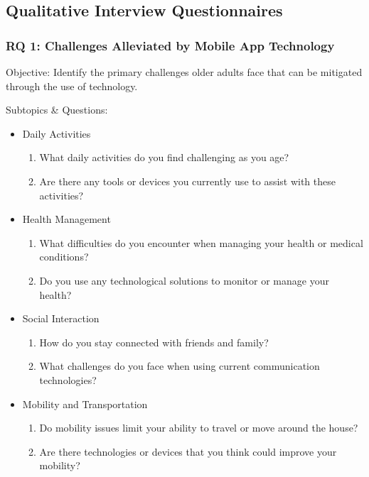 \documentclass[acmlarge]{acmart}
\begin{document}
{\subsection{Qualitative Interview Questionnaires}
\subsubsection{RQ 1: Challenges Alleviated by Mobile App Technology}
Objective: Identify the primary challenges older adults face that can be mitigated through the use of technology.

Subtopics \& Questions:
\begin{itemize}
    \item Daily Activities
    \begin{enumerate}
        \item What daily activities do you find challenging as you age?
        \item Are there any tools or devices you currently use to assist with these activities?
    \end{enumerate}
    
    \item Health Management
    \begin{enumerate}
        \item What difficulties do you encounter when managing your health or medical conditions?
        \item Do you use any technological solutions to monitor or manage your health?
    \end{enumerate}
    
    \item Social Interaction
    \begin{enumerate}
        \item How do you stay connected with friends and family?
        \item What challenges do you face when using current communication technologies?
    \end{enumerate}
    
    \item Mobility and Transportation
    \begin{enumerate}
        \item Do mobility issues limit your ability to travel or move around the house?
        \item Are there technologies or devices that you think could improve your mobility?
    \end{enumerate}
\end{itemize}

}
\end{document}
